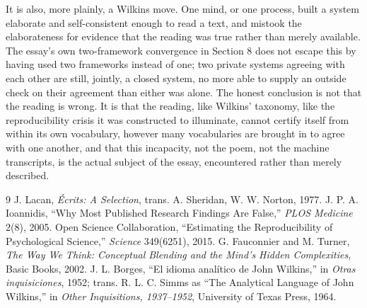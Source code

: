 \documentclass[11pt]{article}
\begin{document}
It is also, more plainly, a Wilkins move. One mind, or one process, built a system elaborate and self-consistent enough to read a text, and mistook the elaborateness for evidence that the reading was true rather than merely available. The essay's own two-framework convergence in Section 8 does not escape this by having used two frameworks instead of one; two private systems agreeing with each other are still, jointly, a closed system, no more able to supply an outside check on their agreement than either was alone. The honest conclusion is not that the reading is wrong. It is that the reading, like Wilkins' taxonomy, like the reproducibility crisis it was constructed to illuminate, cannot certify itself from within its own vocabulary, however many vocabularies are brought in to agree with one another, and that this incapacity, not the poem, not the machine transcripts, is the actual subject of the essay, encountered rather than merely described.

\begin{thebibliography}{9}
 J. Lacan, \emph{{\'E}crits: A Selection}, trans. A. Sheridan, W. W. Norton, 1977.
 J. P. A. Ioannidis, ``Why Most Published Research Findings Are False,'' \emph{PLOS Medicine} 2(8), 2005.
 Open Science Collaboration, ``Estimating the Reproducibility of Psychological Science,'' \emph{Science} 349(6251), 2015.
 G. Fauconnier and M. Turner, \emph{The Way We Think: Conceptual Blending and the Mind's Hidden Complexities}, Basic Books, 2002.
 J. L. Borges, ``El idioma anal{\'i}tico de John Wilkins,'' in \emph{Otras inquisiciones}, 1952; trans. R. L. C. Simms as ``The Analytical Language of John Wilkins,'' in \emph{Other Inquisitions, 1937--1952}, University of Texas Press, 1964.
\end{thebibliography}
\end{document}

